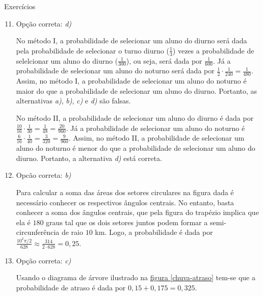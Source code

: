 \begin{answer}{Exercícios}
{\exerciselist
\begin{enumerate}\setcounter{enumi}{10}
\item Opção correta: \textit{d)}

No método I, a probabilidade de selecionar um aluno do diurno será dada pela probabilidade de selecionar o turno diurno ($\frac{1}{3}$) vezes a probabilidade de selelcionar um aluno do diurno ($\frac{1}{300}$), ou seja, será dada por $\frac{1}{600}$. Já a probabilidade de selecionar um aluno do noturno será dada por $\frac{1}{2}\cdot\frac{1}{240}=\frac{1}{480}$. Assim, no método I, a probabilidade de selecionar um aluno do noturno é maior do que a probabilidade de selecionar um aluno do diurno. Portanto, as alternativas \textit{a)}, \textit{b)}, \textit{c)} e \textit{d)} são falsas.

No método II, a probabilidade de selecionar um aluno do diurno é dada por $\frac{10}{16}\cdot\frac{1}{30}=\frac{1}{48}=\frac{20}{960}$. Já a probabilidade de selecionar um aluno do noturno é $\frac{6}{16}\cdot\frac{1}{40}=\frac{3}{320}=\frac{9}{960}$. Assim, no método II, a probabilidade de selecionar um aluno do noturno é menor do que a probabilidade de selecionar um aluno do diurno. Portanto, a alternativa \textit{d)} está correta.

\item Opcão correta: \textit{b)}

Para calcular a soma das áreas dos setores circulares na figura dada é necessário conhecer os respectivos ângulos centrais. No entanto, basta conhecer a soma dos ângulos centrais, que pela figura do trapézio implica que ela é $180$ graus tal que os dois setores juntos podem formar a semi-circunferência de raio $10$ km. Logo, a probabilidade é dada por $\frac{10^2\pi/2}{628}\approx\frac{314}{2\cdot628}=0{,}25$.

\item Opção correta: \textit{c)}

Usando o diagrama de árvore ilustrado na \hyperref[chuva-atraso]{figura \ref{chuva-atraso}} tem-se que a probabilidade de atraso é dada por $0{,}15+0{,}175=0{,}325$.\textbf{}

\notas
{
\begin{figure}[H]
\centering

\resizebox{\linewidth}{!}
{
}
\end{figure}}
\end{enumerate}}
\end{answer}
